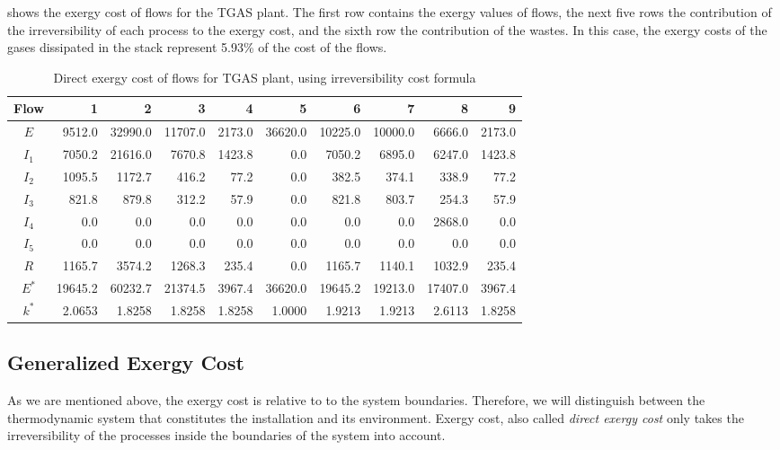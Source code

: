 \documentclass{ecos2018}
\begin{document}
 shows the exergy cost of flows for the TGAS plant.
The first row contains the exergy values of flows, the next five rows the contribution of the irreversibility of each process to the exergy cost, and the sixth row the contribution of the wastes. In this case, the exergy costs of the gases dissipated in the stack represent 5.93\% of the cost of the flows.
\newpage
\begin{table}[H]
	\small
	\caption{Direct exergy cost of flows for TGAS plant, using irreversibility cost formula}
	\begin{tabular}{crrrrrrrrr}
		\toprule
		Flow & 1 & 2 & 3 & 4 & 5 & 6 & 7 & 8 & 9 \\
		\midrule
		$E$     & 9512.0 & 32990.0 & 11707.0 & 2173.0 & 36620.0 & 10225.0 & 10000.0 & 6666.0 & 2173.0 \\
		\midrule
		$I_1$    & 7050.2 & 21616.0 & 7670.8 & 1423.8 & 0.0   & 7050.2 & 6895.0 & 6247.0 & 1423.8 \\
		$I_2$    & 1095.5 & 1172.7 & 416.2 & 77.2  & 0.0   & 382.5 & 374.1 & 338.9 & 77.2 \\
		$I_3$    & 821.8 & 879.8 & 312.2 & 57.9  & 0.0   & 821.8 & 803.7 & 254.3 & 57.9 \\
		$I_4$    & 0.0   & 0.0   & 0.0   & 0.0   & 0.0   & 0.0   & 0.0   & 2868.0 & 0.0 \\
		$I_5$    & 0.0   & 0.0   & 0.0   & 0.0   & 0.0   & 0.0   & 0.0   & 0.0   & 0.0 \\
		$R$     & 1165.7 & 3574.2 & 1268.3 & 235.4 & 0.0   & 1165.7 & 1140.1 & 1032.9 & 235.4 \\
		\midrule
		$E^*$ & 19645.2 & 60232.7 & 21374.5 & 3967.4 & 36620.0 & 19645.2 & 19213.0 & 17407.0 & 3967.4 \\
		\midrule
		$k^*$ & 2.0653  & 1.8258	& 1.8258  &	1.8258 & 1.0000	& 1.9213 & 1.9213 & 2.6113 & 1.8258 \\
		\bottomrule
	\end{tabular}%
	\label{tab4}%
\end{table}%

\subsection{Generalized Exergy Cost}
As we are mentioned above, the exergy cost is relative to  to the system boundaries.
Therefore, we will distinguish between the thermodynamic system that constitutes the installation and its environment. Exergy cost, also called \emph{direct exergy cost} only takes the irreversibility of the processes inside the boundaries of the system into account. 
\end{document}
